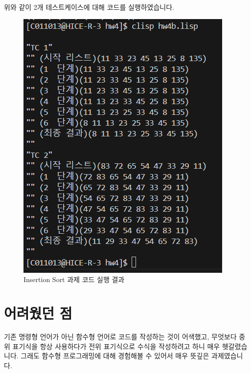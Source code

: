 \documentclass{article}
\begin{document}
위와 같이 2개 테스트케이스에 대해 코드를 실행하였습니다.
\begin{figure}[!htb]
    \centering
    \includegraphics[width=0.5\linewidth]{hw4_img3.png}
    \caption{Insertion Sort 과제 코드 실행 결과}
    \label{fig-2}
\end{figure}

\section{어려웠던 점}
\quad 기존 명령형 언어가 아닌 함수형 언어로 코드를 작성하는 것이 어색했고, 무엇보다 중위 표기식을 항상 사용하다가 전위 표기식으로 수식을 작성하려고 하니 매우 헷갈렸습니다. 그래도 함수형 프로그래밍에 대해 경험해볼 수 있어서 매우 뜻깊은 과제였습니다.
\end{document}

